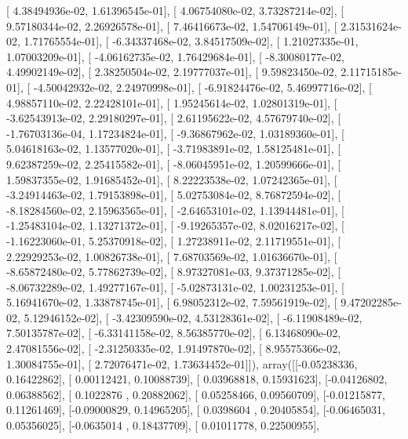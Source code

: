 \documentclass{article}
\begin{document}
       [  4.38494936e-02,   1.61396545e-01],
       [  4.06754080e-02,   3.73287214e-02],
       [  9.57180344e-02,   2.26926578e-01],
       [  7.46416673e-02,   1.54706149e-01],
       [  2.31531624e-02,   1.71765554e-01],
       [ -6.34337468e-02,   3.84517509e-02],
       [  1.21027335e-01,   1.07003209e-01],
       [ -4.06162735e-02,   1.76429684e-01],
       [ -8.30080177e-02,   4.49902149e-02],
       [  2.38250504e-02,   2.19777037e-01],
       [  9.59823450e-02,   2.11715185e-01],
       [ -4.50042932e-02,   2.24970998e-01],
       [ -6.91824476e-02,   5.46997716e-02],
       [  4.98857110e-02,   2.22428101e-01],
       [  1.95245614e-02,   1.02801319e-01],
       [ -3.62543913e-02,   2.29180297e-01],
       [  2.61195622e-02,   4.57679740e-02],
       [ -1.76703136e-04,   1.17234824e-01],
       [ -9.36867962e-02,   1.03189360e-01],
       [  5.04618163e-02,   1.13577020e-01],
       [ -3.71983891e-02,   1.58125481e-01],
       [  9.62387259e-02,   2.25415582e-01],
       [ -8.06045951e-02,   1.20599666e-01],
       [  1.59837355e-02,   1.91685452e-01],
       [  8.22223538e-02,   1.07242365e-01],
       [ -3.24914463e-02,   1.79153898e-01],
       [  5.02753084e-02,   8.76872594e-02],
       [ -8.18284560e-02,   2.15963565e-01],
       [ -2.64653101e-02,   1.13944481e-01],
       [ -1.25483104e-02,   1.13271372e-01],
       [ -9.19265357e-02,   8.02016217e-02],
       [ -1.16223060e-01,   5.25370918e-02],
       [  1.27238911e-02,   2.11719551e-01],
       [  2.22929253e-02,   1.00826738e-01],
       [  7.68703569e-02,   1.01636670e-01],
       [ -8.65872480e-02,   5.77862739e-02],
       [  8.97327081e-03,   9.37371285e-02],
       [ -8.06732289e-02,   1.49277167e-01],
       [ -5.02873131e-02,   1.00231253e-01],
       [  5.16941670e-02,   1.33878745e-01],
       [  6.98052312e-02,   7.59561919e-02],
       [  9.47202285e-02,   5.12946152e-02],
       [ -3.42309590e-02,   4.53128361e-02],
       [ -6.11908489e-02,   7.50135787e-02],
       [ -6.33141158e-02,   8.56385770e-02],
       [  6.13468090e-02,   2.47081556e-02],
       [ -2.31250335e-02,   1.91497870e-02],
       [  8.95575366e-02,   1.30084755e-01],
       [  2.72076471e-02,   1.73634452e-01]]), array([[-0.05238336,  0.16422862],
       [ 0.00112421,  0.10088739],
       [ 0.03968818,  0.15931623],
       [-0.04126802,  0.06388562],
       [ 0.1022876 ,  0.20882062],
       [ 0.05258466,  0.09560709],
       [-0.01215877,  0.11261469],
       [-0.09000829,  0.14965205],
       [ 0.0398604 ,  0.20405854],
       [-0.06465031,  0.05356025],
       [-0.0635014 ,  0.18437709],
       [ 0.01011778,  0.22500955],
\end{document}
